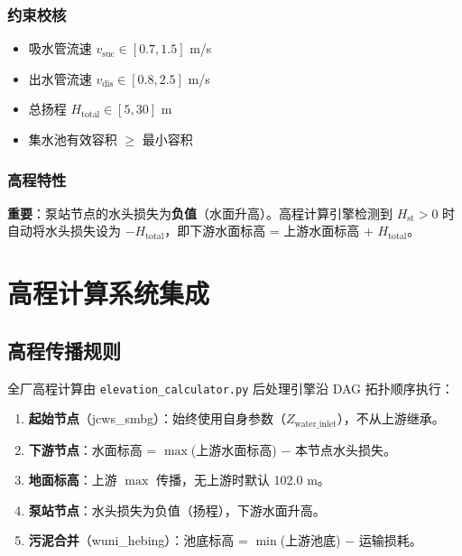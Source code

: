 \documentclass[12pt,a4paper]{ctexart}
\begin{document}
\subsubsection{约束校核}
\begin{itemize}[itemsep=0pt]
    \item 吸水管流速 $v_{\text{suc}} \in [0.7, 1.5]$ m/s
    \item 出水管流速 $v_{\text{dis}} \in [0.8, 2.5]$ m/s
    \item 总扬程 $H_{\text{total}} \in [5, 30]$ m
    \item 集水池有效容积 $\geq$ 最小容积
\end{itemize}

\subsubsection{高程特性}

\textbf{重要}：泵站节点的水头损失为\textbf{负值}（水面升高）。高程计算引擎检测到 $H_{\text{st}} > 0$ 时自动将水头损失设为 $-H_{\text{total}}$，即下游水面标高 = 上游水面标高 + $H_{\text{total}}$。

\newpage

\section{高程计算系统集成}

\subsection{高程传播规则}

全厂高程计算由 \texttt{elevation\_calculator.py} 后处理引擎沿 DAG 拓扑顺序执行：

\begin{enumerate}[label=\textbf{规则 \arabic*：}, leftmargin=*]
    \item \textbf{起始节点}（jcws\_smbg）：始终使用自身参数（$Z_{\text{water\_inlet}}$），不从上游继承。
    \item \textbf{下游节点}：水面标高 = $\max$(上游水面标高) $-$ 本节点水头损失。
    \item \textbf{地面标高}：上游 $\max$ 传播，无上游时默认 102.0 m。
    \item \textbf{泵站节点}：水头损失为负值（扬程），下游水面升高。
    \item \textbf{污泥合并}（wuni\_hebing）：池底标高 = $\min$(上游池底) $-$ 运输损耗。
\end{enumerate}
\end{document}
